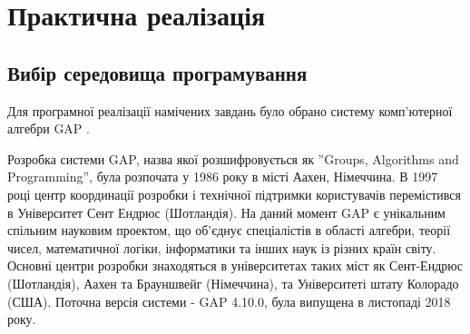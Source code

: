 \newpage
\renewcommand{\proofname}{Доведення}
\renewcommand{\chaptername}{РОЗДІЛ}
\chapter[Текст для содержания]{Практична реалізація}
\label{ch3}


\section{Вибір середовища програмування}
\label{section.3.1}

Для програмної реалізації намічених завдань було обрано систему комп'ютерної алгебри \textsf{GAP} \cite{GAP4}.

Розробка системи \textsf{GAP}, назва якої розшифровується як ''Groups, Algorithms and Programming'', була розпочата у 1986 року в місті Аахен, Німеччина. В 1997 році центр координації розробки і технічної підтримки користувачів перемістився в Університет Сент Ендрюс (Шотландія). На даний момент \textsf{GAP} є унікальним спільним науковим проектом, що об'єднує спеціалістів в області алгебри, теорії чисел, математичної логіки, інформатики та інших наук із різних країн світу. Основні центри розробки знаходяться в університетах таких  міст як Сент-Ендрюс (Шотландія), Аахен та Брауншвейг (Німеччина), та Університеті штату Колорадо (США). Поточна версія системи - \textsf{GAP} 4.10.0, була випущена в листопаді 2018 року.

